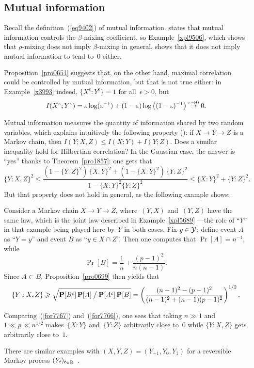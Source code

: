 \subsection{Mutual information}

Recall the definition~(\ref{eq9402}) of mutual information.
\cite[Theorem~5.3(III)]{Bradley-book} states that mutual information controls
the $\beta$-mixing coefficient, so Example~\ref{xpl9506}, which
shows that $\rho$-mixing does not imply $\beta$-mixing in general,
shows that it does not imply mutual information to tend to~$0$ either.

Proposition~\ref{pro0651} suggests that, on the other hand,
maximal correlation could be controlled by mutual information,
but that is not true either: in Example~\ref{x3993} indeed,
$\{X^\epsilon:Y^\epsilon\} = 1$ for all~$\epsilon > 0$, but
\[ I(X^\epsilon;Y^\epsilon) =
\epsilon \ln (\epsilon^{-1}) + (1-\epsilon) \ln \big((1-\epsilon)^{-1}\big)
\stackrel{\epsilon\longto0}{\longto} 0 .\]

Mutual information measures the quantity of information shared by two random variables,
which explains intuitively the following property (\cite[Theorem~2.5.2]{CoverThomas}):
if $X\to Y\to Z$ is a Markov chain, then $I(Y;X,Z) \leq I(X;Y) + I(Y;Z)$.
Does a similar inequality hold for Hilbertian correlation?
In the Gaussian case, the answer is ``yes'' thanks to Theorem~\ref{pro1857}:
one gets that
\[ \{Y:X,Z\}^2 \leq
\frac{(1-\{Y:Z\}^2)\,\{X:Y\}^2 + (1-\{X:Y\}^2)\,\{Y:Z\}^2} {1-\{X:Y\}^2\{Y:Z\}^2}
\leq \{X:Y\}^2 + \{Y:Z\}^2 .\]
%
But that property does not hold in general, as the following example shows:

\begin{Xpl}\label{xpl1151}
Consider a Markov chain $X\to Y\to Z$,
where~$(Y,X)$ and~$(Y,Z)$ have the same law, which is the joint law described in Example~\ref{xpl5689}%
—the role of ``$Y$'' in that example being played here by~$Y$ in both cases.
Fix $y \in \mathcal{Y}$; define event $A$ as ``$Y=y$''
and event $B$ as ``$y\in X\cap Z$''.
Then one computes that $\Pr[A] = n^{-1}$, while
\[ \Pr[B] = \frac{1}{n} + \frac{(p-1)^2}{n(n-1)} .\]
Since $A \subset B$, Proposition~\ref{pro0699}
then yields that
\[\label{for7766} \{Y:X,Z\} \geq \sqrt{\Pr[\C{B}]\Pr[A] \mathbin{\big/} \Pr[\C{A}]\Pr[B]}
= \left(\frac{(n-1)^2 - (p-1)^2} {(n-1)^2 + (n-1)(p-1)^2}\right)^{1/2} .\]

Comparing~(\ref{for7767}) and~(\ref{for7766}),
one sees that taking $n \gg 1$ and $1 \ll p \ll n^{1/2}$
makes~${\{X:Y\}}$ and~${\{Y:Z\}}$ arbitrarily close to~$0$
while $\{Y:X,Z\}$ gets arbitrarily close to~$1$.
\end{Xpl}

\begin{Rmk}
There are similar examples with $(X,Y,Z) = (Y_{-1},Y_0,Y_1)$ for a reversible Markov process $(Y_t)_{t\in\mathbb{R}}$~\cite{perso}.
\end{Rmk}

